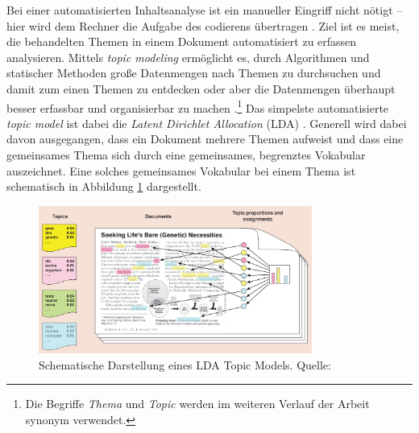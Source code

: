 \documentclass[12pt, 
    twoside=false, 
    bibliography=totoc, 
    numbers=endperiod, 
    headings=normal, 
    toc=chapterentrydotfill
    ]{scrbook}
\begin{document}
Bei einer automatisierten Inhaltsanalyse ist ein manueller Eingriff nicht nötigt -- hier wird dem Rechner die Aufgabe des codierens übertragen \parencite[161]{brosius_2012}. Ziel ist es meist, die behandelten Themen in einem Dokument automatisiert zu erfassen \parencite[36f.]{niekler_2018} analysieren. Mittels \emph{topic modeling} ermöglicht es, durch Algorithmen und statischer Methoden große Datenmengen nach Themen zu durchsuchen und damit zum einen Themen zu entdecken oder aber die Datenmengen überhaupt besser erfassbar und organisierbar zu machen \parencites[vgl.][77ff.]{blei_2012}[vgl.][163]{brosius_2012}.\footnote{Die Begriffe \emph{Thema} und \emph{Topic} werden im weiteren Verlauf der Arbeit synonym verwendet.} Das simpelste automatisierte \emph{topic model} ist dabei die \emph{Latent Dirichlet Allocation} (LDA) \parencite[78]{blei_2012}. Generell wird dabei davon ausgegangen, dass ein Dokument mehrere Themen aufweist \parencites[78]{blei_2012}[88]{niekler_2018} und dass eine gemeinsames Thema sich durch eine gemeinsames, begrenztes Vokabular auszeichnet.
Eine solches gemeinsames Vokabular bei einem Thema ist schematisch in Abbildung \ref{fig:lda_example} dargestellt.

\begin{figure}
    \centering
    \includegraphics[width=0.8\textwidth]{document/images/lda_topic_model.png}
    \caption[Schematische Darstellung eines LDA Topic Models]{Schematische Darstellung eines LDA Topic Models. Quelle:  \parencite{blei_2012}}
    \label{fig:lda_example}
\end{figure}
\end{document}
